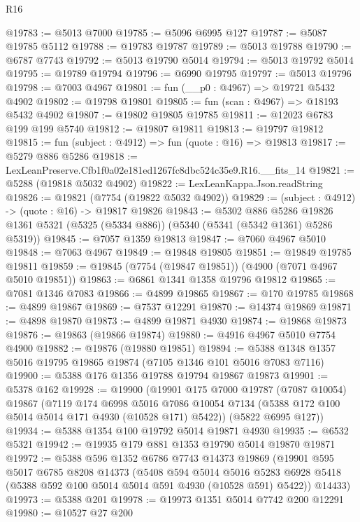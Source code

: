 \begin{lexlean}{R16}
\begin{coremodule}
@19783 := @5013 @7000
@19785 := @5096 @6995 @127
@19787 := @5087 @19785 @5112
@19788 := @19783 @19787
@19789 := @5013 @19788
@19790 := @6787 @7743
@19792 := @5013 @19790 @5014
@19794 := @5013 @19792 @5014
@19795 := @19789 @19794
@19796 := @6990 @19795
@19797 := @5013 @19796
@19798 := @7003 @4967
@19801 := fun (__p0 : @4967) => @19721 @5432 @4902
@19802 := @19798 @19801
@19805 := fun (scan : @4967) => @18193 @5432 @4902
@19807 := @19802 @19805 @19785
@19811 := @12023 @6783 @199 @199 @5740
@19812 := @19807 @19811
@19813 := @19797 @19812
@19815 := fun (subject : @4912) => fun (quote : @16) => @19813
@19817 := @5279 @886 @5286
@19818 := LexLeanPreserve.Cfb1f0a02e181ed1267fc8dbc524c35e9.R16.__fits_14
@19821 := @5288 (@19818 @5032 @4902)
@19822 := LexLeanKappa.Json.readString
@19826 := @19821 (@7754 (@19822 @5032 @4902))
@19829 := (subject : @4912) -> (quote : @16) -> @19817 @19826
@19843 := @5302
    @886
    @5286
    @19826
    @1361
    @5321
    (@5325 (@5334 @886))
    (@5340 (@5341 (@5342 @1361) @5286 @5319))
@19845 := @7057 @1359 @19813
@19847 := @7060 @4967 @5010
@19848 := @7063 @4967
@19849 := @19848 @19805
@19851 := @19849 @19785 @19811
@19859 := @19845 (@7754 (@19847 @19851)) (@4900 (@7071 @4967 @5010 @19851))
@19863 := @6861 @1341 @1358 @19796 @19812
@19865 := @7081 @1346 @7083
@19866 := @4899 @19865
@19867 := @170 @19785
@19868 := @4899 @19867
@19869 := @7537 @12291
@19870 := @14374 @19869
@19871 := @4898 @19870
@19873 := @4899 @19871 @4930
@19874 := @19868 @19873
@19876 := @19863 (@19866 @19874)
@19880 := @4916 @4967 @5010 @7754 @4900
@19882 := @19876 (@19880 @19851)
@19894 := @5388 @1348 @1357 @5016 @19795 @19865 @19874 (@7105 @1346 @101 @5016 @7083 @7116)
@19900 := @5388 @176 @1356 @19788 @19794 @19867 @19873
@19901 := @5378 @162
@19928 := @19900
    (@19901
      @175
      @7000
      @19787
      (@7087 @10054)
      @19867
      (@7119
        @174
        @6998
        @5016
        @7086
        @10054
        @7134
        (@5388 @172 @100 @5014 @5014 @171 @4930 (@10528 @171) @5422))
      (@5822 @6995 @127))
@19934 := @5388 @1354 @100 @19792 @5014 @19871 @4930
@19935 := @6532 @5321
@19942 := @19935 @179 @881 @1353 @19790 @5014 @19870 @19871
@19972 := @5388
    @596
    @1352
    @6786
    @7743
    @14373
    @19869
    (@19901
      @595
      @5017
      @6785
      @8208
      @14373
      (@5408
        @594
        @5014
        @5016
        @5283
        @6928
        @5418
        (@5388 @592 @100 @5014 @5014 @591 @4930 (@10528 @591) @5422))
      @14433)
@19973 := @5388 @201
@19978 := @19973 @1351 @5014 @7742 @200 @12291
@19980 := @10527 @27 @200

\end{coremodule}
\end{lexlean}
